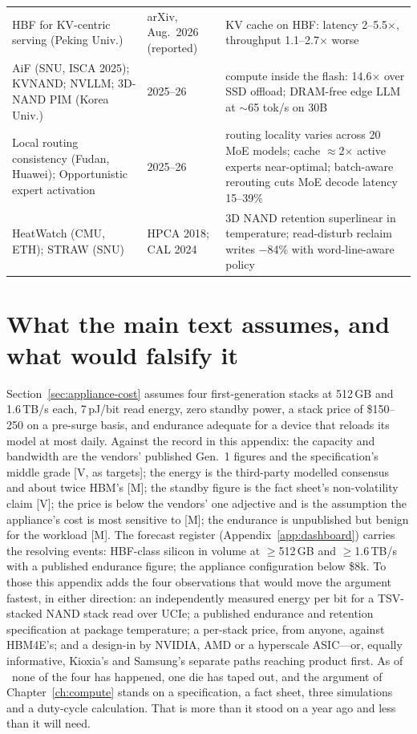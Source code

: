 \begin{table}[htbp]
\begin{tabular}{p{42mm}p{26mm}p{70mm}}
    HBF for KV-centric serving (Peking Univ.) & arXiv, Aug.\ 2026 (reported) & KV cache on HBF: latency 2--5.5$\times$, throughput 1.1--2.7$\times$ worse \\
    AiF (SNU, ISCA 2025); KVNAND; NVLLM; 3D-NAND PIM (Korea Univ.) & 2025--26 & compute inside the flash: 14.6$\times$ over SSD offload; DRAM-free edge LLM at $\sim$65 tok/s on 30B \\
    Local routing consistency (Fudan, Huawei); Opportunistic expert activation & 2025--26 & routing locality varies across 20 MoE models; cache $\approx$2$\times$ active experts near-optimal; batch-aware rerouting cuts MoE decode latency 15--39\% \\
    HeatWatch (CMU, ETH); STRAW (SNU) & HPCA 2018; CAL 2024 & 3D NAND retention superlinear in temperature; read-disturb reclaim writes $-$84\% with word-line-aware policy \\
    \bottomrule
  \end{tabular}
\end{table}

\section{What the main text assumes, and what would falsify it}

Section~\ref{sec:appliance-cost} assumes four first-generation stacks at 512\,GB and 1.6\,TB/s each, 7\,pJ/bit read energy, zero standby power, a stack price of \$150--250 on a pre-surge basis, and endurance adequate for a device that reloads its model at most daily. Against the record in this appendix: the capacity and bandwidth are the vendors' published Gen.\ 1 figures and the specification's middle grade [V, as targets]; the energy is the third-party modelled consensus and about twice HBM's [M]; the standby figure is the fact sheet's non-volatility claim [V]; the price is below the vendors' one adjective and is the assumption the appliance's cost is most sensitive to [M]; the endurance is unpublished but benign for the workload [M]. The forecast register (Appendix~\ref{app:dashboard}) carries the resolving events: HBF-class silicon in volume at $\geq$512\,GB and $\geq$1.6\,TB/s with a published endurance figure; the appliance configuration below \$8k. To those this appendix adds the four observations that would move the argument fastest, in either direction: an independently measured energy per bit for a TSV-stacked NAND stack read over UCIe; a published endurance and retention specification at package temperature; a per-stack price, from anyone, against HBM4E's; and a design-in by NVIDIA, AMD or a hyperscale ASIC---or, equally informative, Kioxia's and Samsung's separate paths reaching product first. As of \datafreeze\ none of the four has happened, one die has taped out, and the argument of Chapter~\ref{ch:compute} stands on a specification, a fact sheet, three simulations and a duty-cycle calculation. That is more than it stood on a year ago and less than it will need.
